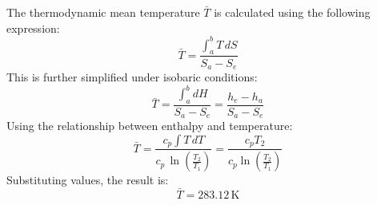 The thermodynamic mean temperature \( \bar{T} \) is calculated using the following expression:  
\[
\bar{T} = \frac{\int_a^b T \, dS}{S_a - S_e}
\]  
This is further simplified under isobaric conditions:  
\[
\bar{T} = \frac{\int_a^b dH}{S_a - S_e} = \frac{h_e - h_a}{S_a - S_e}
\]  
Using the relationship between enthalpy and temperature:  
\[
\bar{T} = \frac{c_p \int T \, dT}{c_p \, \ln\left(\frac{T_2}{T_1}\right)} = \frac{c_p T_2}{c_p \ln\left(\frac{T_2}{T_1}\right)}
\]  
Substituting values, the result is:  
\[
\bar{T} = 283.12 \, \text{K}
\]